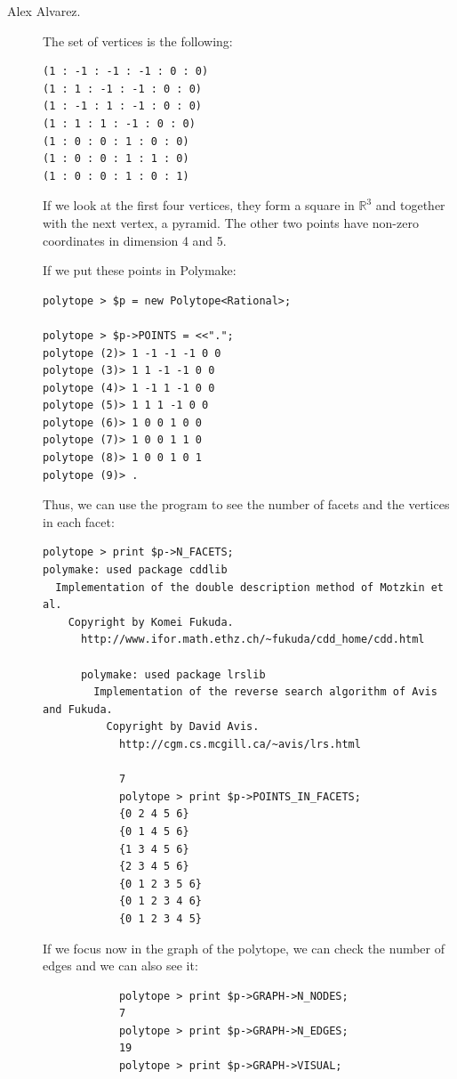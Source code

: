 \begin{description}
\item [Alex Alvarez.] The set of vertices is the following:
\begin{verbatim}
(1 : -1 : -1 : -1 : 0 : 0)
(1 : 1 : -1 : -1 : 0 : 0)
(1 : -1 : 1 : -1 : 0 : 0)
(1 : 1 : 1 : -1 : 0 : 0)
(1 : 0 : 0 : 1 : 0 : 0)
(1 : 0 : 0 : 1 : 1 : 0)
(1 : 0 : 0 : 1 : 0 : 1)
\end{verbatim}
If we look at the first four vertices, they form a square in $\mathbb{R}^3$ and together with the next vertex, a pyramid. The other two points have non-zero coordinates in dimension 4 and 5.

If we put these points in Polymake:
\begin{verbatim}
polytope > $p = new Polytope<Rational>;

polytope > $p->POINTS = <<".";
polytope (2)> 1 -1 -1 -1 0 0
polytope (3)> 1 1 -1 -1 0 0
polytope (4)> 1 -1 1 -1 0 0
polytope (5)> 1 1 1 -1 0 0
polytope (6)> 1 0 0 1 0 0
polytope (7)> 1 0 0 1 1 0
polytope (8)> 1 0 0 1 0 1
polytope (9)> .
\end{verbatim}

Thus, we can use the program to see the number of facets and the vertices in each facet:

\begin{verbatim}
polytope > print $p->N_FACETS;
polymake: used package cddlib
  Implementation of the double description method of Motzkin et al.
    Copyright by Komei Fukuda.
      http://www.ifor.math.ethz.ch/~fukuda/cdd_home/cdd.html

      polymake: used package lrslib
        Implementation of the reverse search algorithm of Avis and Fukuda.
          Copyright by David Avis.
            http://cgm.cs.mcgill.ca/~avis/lrs.html

            7
            polytope > print $p->POINTS_IN_FACETS;
            {0 2 4 5 6}
            {0 1 4 5 6}
            {1 3 4 5 6}
            {2 3 4 5 6}
            {0 1 2 3 5 6}
            {0 1 2 3 4 6}
            {0 1 2 3 4 5}
            \end{verbatim}

            If we focus now in the graph of the polytope, we can check the number of edges and we can also see it:
            \begin{verbatim}
            polytope > print $p->GRAPH->N_NODES;
            7
            polytope > print $p->GRAPH->N_EDGES;
            19
            polytope > print $p->GRAPH->VISUAL;
            \end{verbatim}


\end{description}
